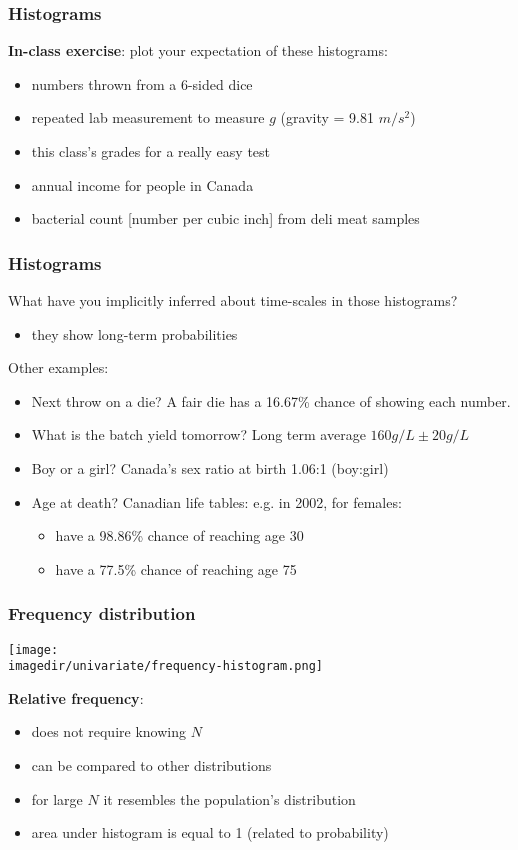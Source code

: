 \begin{frame}\frametitle{Histograms}
	\textbf{In-class exercise}: plot your expectation of these histograms: \vspace{2cm}
	\begin{itemize}
		\item numbers thrown from a 6-sided dice
		\item repeated lab measurement to measure $g$ (gravity = 9.81 $m/s^2$)
		\item this class's grades for a really easy test
		\item annual income for people in Canada
		\item bacterial count [number per cubic inch] from deli meat samples
	\end{itemize}
\end{frame}

\begin{frame}\frametitle{Histograms}
	What have you implicitly inferred about time-scales in those histograms?
	\begin{itemize}
		\item they show long-term probabilities
	\end{itemize}

	Other examples:
	\begin{itemize}
		\item Next throw on a die? A fair die has a 16.67\% chance of showing each number.
		\item What is the batch yield tomorrow? Long term average $160 g/L \pm 20 g/L$
		\item Boy or a girl? Canada's sex ratio at birth 1.06:1 (boy:girl)
		\item Age at death? Canadian life tables: e.g. in 2002, for females:
		\begin{itemize}
			\item have a 98.86\% chance of reaching age 30
			\item have a 77.5\% chance of reaching age 75
		\end{itemize}
	\end{itemize}
\end{frame}

\begin{frame}\frametitle{Frequency distribution}
	\texttt{[image: \\imagedir/univariate/frequency-histogram.png]}

	\textbf{Relative frequency}:
	\begin{itemize}
		\item does not require knowing $N$
		\item can be compared to other distributions
		\item for large $N$ it resembles the population's distribution
		\item area under histogram is equal to 1 (related to probability)
	\end{itemize}
\end{frame}

